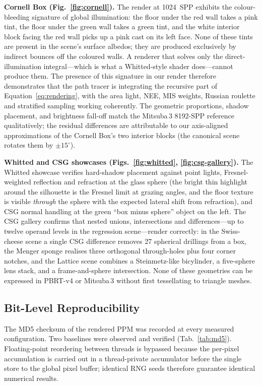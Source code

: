 \documentclass[twocolumn,10pt,cleanhead,cleanfoot]{asme2e}
\begin{document}
\noindent\textbf{Cornell Box (Fig.~\ref{fig:cornell}).}
The render at 1024~SPP exhibits the colour-bleeding signature of global illumination: the floor under the red wall takes a pink tint, the floor under the green wall takes a green tint, and the white interior block facing the red wall picks up a pink cast on its left face. None of these tints are present in the scene's surface albedos; they are produced exclusively by indirect bounces off the coloured walls. A renderer that solves only the direct-illumination integral---which is what a Whitted-style shader does---cannot produce them. The presence of this signature in our render therefore demonstrates that the path tracer is integrating the recursive part of Equation~\eqref{eq:rendering}, with the area light, NEE, MIS weights, Russian roulette and stratified sampling working coherently. The geometric proportions, shadow placement, and brightness fall-off match the Mitsuba\,3 8192-SPP reference qualitatively; the residual differences are attributable to our axis-aligned approximations of the Cornell Box's two interior blocks (the canonical scene rotates them by $\pm 15^{\circ}$).

\noindent\textbf{Whitted and CSG showcases (Figs.~\ref{fig:whitted}, \ref{fig:csg-gallery}).}
The Whitted showcase verifies hard-shadow placement against point lights, Fresnel-weighted reflection and refraction at the glass sphere (the bright thin highlight around the silhouette is the Fresnel limit at grazing angles, and the floor texture is visible \emph{through} the sphere with the expected lateral shift from refraction), and CSG normal handling at the green ``box minus sphere'' object on the left. The CSG gallery confirms that nested unions, intersections and differences---up to twelve operand levels in the regression scene---render correctly: in the Swiss-cheese scene a single CSG difference removes 27 spherical drillings from a box, the Menger sponge realises three orthogonal through-holes plus four corner notches, and the Lattice scene combines a Steinmetz-like bicylinder, a five-sphere lens stack, and a frame-and-sphere intersection. None of these geometries can be expressed in PBRT-v4 or Mitsuba\,3 without first tessellating to triangle meshes.

\subsection*{Bit-Level Reproducibility}
The MD5 checksum of the rendered PPM was recorded at every measured configuration. Two baselines were observed and verified (Tab.~\ref{tab:md5}). Floating-point reordering between threads is bypassed because the per-pixel accumulation is carried out in a thread-private accumulator before the single store to the global pixel buffer; identical RNG seeds therefore guarantee identical numerical results.
\end{document}
